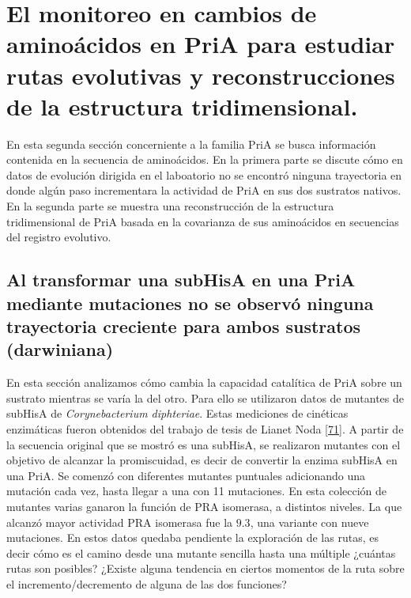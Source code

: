 \documentclass[12pt,twoside]{reedthesis}
\begin{document}
  \section{El monitoreo en cambios de aminoácidos en PriA para estudiar
  rutas evolutivas y reconstrucciones de la estructura
  tridimensional.}\label{el-monitoreo-en-cambios-de-aminoacidos-en-pria-para-estudiar-rutas-evolutivas-y-reconstrucciones-de-la-estructura-tridimensional.}
  
  En esta segunda sección concerniente a la familia PriA se busca
  información contenida en la secuencia de aminoácidos. En la primera
  parte se discute cómo en datos de evolución dirigida en el laboatorio no
  se encontró ninguna trayectoria en donde algún paso incrementara la
  actividad de PriA en sus dos sustratos nativos. En la segunda parte se
  muestra una reconstrucción de la estructura tridimensional de PriA
  basada en la covarianza de sus aminoácidos en secuencias del registro
  evolutivo.
  
  \subsection{Al transformar una subHisA en una PriA mediante mutaciones
  no se observó ninguna trayectoria creciente para ambos sustratos
  (darwiniana)}\label{al-transformar-una-subhisa-en-una-pria-mediante-mutaciones-no-se-observo-ninguna-trayectoria-creciente-para-ambos-sustratos-darwiniana}
  
  En esta sección analizamos cómo cambia la capacidad catalítica de PriA
  sobre un sustrato mientras se varía la del otro. Para ello se utilizaron
  datos de mutantes de subHisA de \emph{Corynebacterium diphteriae}. Estas
  mediciones de cinéticas enzimáticas fueron obtenidos del trabajo de
  tesis de Lianet Noda {[}\protect\hyperlink{ref-noda_tesis_2012}{71}{]}.
  A partir de la secuencia original que se mostró es una subHisA, se
  realizaron mutantes con el objetivo de alcanzar la promiscuidad, es
  decir de convertir la enzima subHisA en una PriA. Se comenzó con
  diferentes mutantes puntuales adicionando una mutación cada vez, hasta
  llegar a una con 11 mutaciones. En esta colección de mutantes varias
  ganaron la función de PRA isomerasa, a distintos niveles. La que alcanzó
  mayor actividad PRA isomerasa fue la \(9.3\), una variante con nueve
  mutaciones. En estos datos quedaba pendiente la exploración de las
  rutas, es decir cómo es el camino desde una mutante sencilla hasta una
  múltiple ¿cuántas rutas son posibles? ¿Existe alguna tendencia en
  ciertos momentos de la ruta sobre el incremento/decremento de alguna de
  las dos funciones?
  
\end{document}
